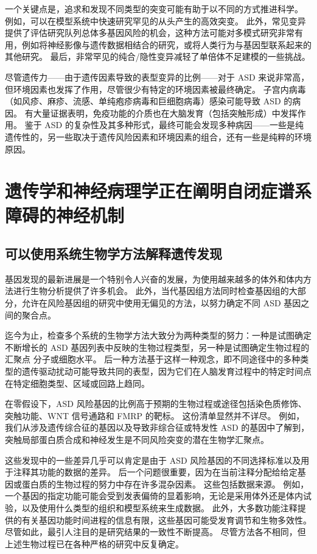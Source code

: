 一个关键点是，追求和发现不同类型的突变可能有助于以不同的方式推进科学。 例如，可以在模型系统中快速研究罕见的从头产生的高效突变。 此外，常见变异提供了评估研究队列总体多基因风险的机会，这种方法可能对多模式研究非常有用，例如将神经影像与遗传数据相结合的研究，或将人类行为与基因型联系起来的其他研究。 最后，非常罕见的纯合/隐性变异减轻了单倍体不足建模的一些挑战。

尽管遗传力——由于遗传因素导致的表型变异的比例——对于 ASD 来说非常高，但环境因素也发挥了作用，尽管很少有特定的环境因素被最终确定。 子宫内病毒（如风疹、麻疹、流感、单纯疱疹病毒和巨细胞病毒）感染可能导致 ASD 的病因。 有大量证据表明，免疫功能的介质也在大脑发育（包括突触形成）中发挥作用。 鉴于 ASD 的复杂性及其多种形式，最终可能会发现多种病因——一些是纯遗传性的，另一些取决于遗传风险因素和环境因素的组合，还有一些是纯粹的环境原因。

\section{遗传学和神经病理学正在阐明自闭症谱系障碍的神经机制}
\subsection{可以使用系统生物学方法解释遗传发现}
基因发现的最新进展是一个特别令人兴奋的发展，为使用越来越多的体外和体内方法进行生物分析提供了许多机会。 此外，当代基因组方法同时检查基因组的大部分，允许在风险基因组的研究中使用无偏见的方法，以努力确定不同 ASD 基因之间的聚合点。

迄今为止，检查多个系统的生物学方法大致分为两种类型的努力：一种是试图确定不断增长的 ASD 基因列表中反映的生物过程类型，另一种是试图确定生物过程的汇聚点 分子或细胞水平。 后一种方法基于这样一种观念，即不同途径中的多种类型的遗传驱动扰动可能导致共同的表型，因为它们在人脑发育过程中的特定时间点在特定细胞类型、区域或回路上趋同。

在零假设下，ASD 风险基因的比例高于预期的生物过程或途径包括染色质修饰、突触功能、WNT 信号通路和 FMRP 的靶标。 这份清单显然并不详尽。 例如，我们从涉及遗传综合征的基因以及导致非综合征或特发性 ASD 的基因中了解到，突触局部蛋白质合成和神经发生是不同风险突变的潜在生物学汇聚点。

这些发现中的一些差异几乎可以肯定是由于 ASD 风险基因的不同选择标准以及用于注释其功能的数据的差异。 后一个问题很重要，因为在当前注释分配给给定基因或蛋白质的生物过程的努力中存在许多混杂因素。 这些包括数据来源。 例如，一个基因的指定功能可能会受到发表偏倚的显着影响，无论是采用体外还是体内试验，以及使用什么类型的组织和模型系统来生成数据。 此外，大多数功能注释提供的有关基因功能时间进程的信息有限，这些基因可能受发育调节和生物多效性。 尽管如此，最引人注目的是研究结果的一致性不断提高。 尽管方法各不相同，但上述生物过程已在各种严格的研究中反复确定。

